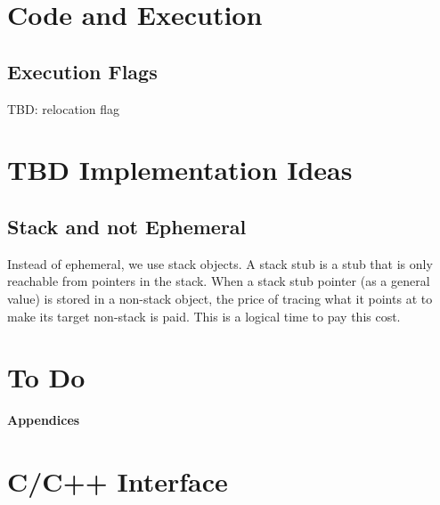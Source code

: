 \documentclass[12pt]{article}
\begin{document}
\section{Code and Execution}

\subsection{Execution Flags}
\label{EXECUTION-FLAGS}

TBD: relocation flag

\section{TBD Implementation Ideas}


\subsection{Stack and not Ephemeral}

Instead of ephemeral, we use stack objects.  A stack stub is a stub that
is only reachable from pointers in the stack.   When a stack stub
pointer (as a general value) is stored in a non-stack object, the price
of tracing what it points at to make its target non-stack is paid.
This is a logical time to pay this cost.

\section{To Do}

\clearpage

\appendix

\centerline{\Large \bf Appendices}

\section{C/C++ Interface}
\label{C/C++-Interface}
\end{document}

